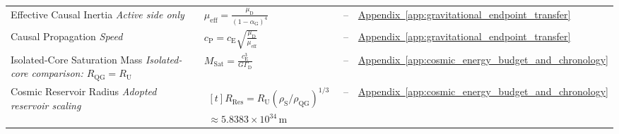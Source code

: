 \begin{longtable}{@{} p{4.5cm} p{6cm} c p{4cm} @{}}
{\raggedright Effective Causal Inertia \newline \textit{Active side only}\par} & {\raggedright $\mu_{\mathrm{eff}} = \frac{\mu_{\mathrm{D}}}{(1 - \alpha_{\mathrm{G}})^4}$\par} & -- & {\raggedright \hyperref[app:gravitational_endpoint_transfer]{Appendix~\ref*{app:gravitational_endpoint_transfer}}\par} \\

{\raggedright Causal Propagation \newline \textit{Speed}\par} & {\raggedright $c_{\mathrm{P}} = c_{\mathrm{E}} \sqrt{\frac{\mu_{\mathrm{D}}}{\mu_{\mathrm{eff}}}}$\par} & -- & {\raggedright \hyperref[app:gravitational_endpoint_transfer]{Appendix~\ref*{app:gravitational_endpoint_transfer}}\par} \\

{\raggedright Isolated-Core Saturation Mass \newline \textit{Isolated-core comparison: $R_{\mathrm{QG}}=R_{\mathrm U}$}\par} & {\raggedright $M_{\mathrm{Sat}} = \frac{c_{\mathrm{E}}^3}{G \Gamma_{\mathrm{D}}}$\par} & -- & {\raggedright \hyperref[app:cosmic_energy_budget_and_chronology]{Appendix~\ref*{app:cosmic_energy_budget_and_chronology}}\par} \\

{\raggedright Cosmic Reservoir Radius \newline \textit{Adopted reservoir scaling}\par} & {\raggedright $\begin{gathered}[t]R_{\mathrm{Res}}=R_{\mathrm U}(\rho_{\mathrm S}/\rho_{\mathrm{QG}})^{1/3} \\ \approx5.8383\times10^{34}\,\mathrm m\end{gathered}$\par} & -- & {\raggedright \hyperref[app:cosmic_energy_budget_and_chronology]{Appendix~\ref*{app:cosmic_energy_budget_and_chronology}}\par} \\


\end{longtable}
